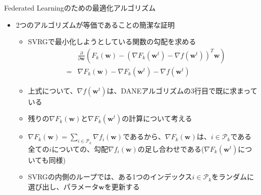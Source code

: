 \documentclass[dvipdfmx,notheorems,t]{beamer}
\begin{document}
\begin{frame}{Federated Learningのための最適化アルゴリズム}

\begin{itemize}
	\item 2つのアルゴリズムが等価であることの簡潔な証明
	\begin{itemize}
		\item SVRGで最小化しようとしている関数の勾配を求める
		\begin{eqnarray}
			&& \frac{\partial}{\partial \bm{w}} \left( F_k(\bm{w}) - \left( \nabla F_k(\bm{w}^t) - \nabla f(\bm{w}^t) \right)^T \bm{w} \right) \nonumber \\
			&=& \nabla F_k(\bm{w}) - \nabla F_k(\bm{w}^t) - \nabla f(\bm{w}^t)
		\end{eqnarray}
		
		\item 上式について、$\nabla f(\bm{w}^t)$は、DANEアルゴリズムの3行目で既に求まっている
		\item 残りの$\nabla F_k(\bm{w})$と$\nabla F_k(\bm{w}^t)$の計算について考える
		\newline
		
		\item $\nabla F_k(\bm{w}) = \sum_{i \in \mathcal{P}_k} \nabla f_i(\bm{w})$であるから、$\nabla F_k(\bm{w})$は、$i \in \mathcal{P}_k$である全ての$i$についての、勾配$\nabla f_i(\bm{w})$の足し合わせである($\nabla F_k(\bm{w}^t)$についても同様)
		\newline
		
		\item SVRGの内側のループでは、ある1つのインデックス$i \in \mathcal{P}_k$をランダムに選び出し、パラメータ$\bm{w}$を更新する
	\end{itemize}
\end{itemize}

\end{frame}
\end{document}
